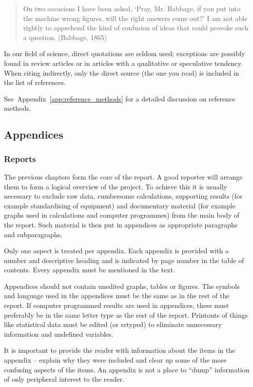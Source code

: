 \documentclass[a5paper, 10pt]{article}
\begin{document}
\begin{quote}
  On two occasions I have been asked, `Pray, Mr. Babbage, if you put
  into the machine wrong figures, will the right answers come out?' I
  am not able rightly to apprehend the kind of confusion of ideas that
  could provoke such a question. (Babbage, 1865)
\end{quote}

In our field of science, direct quotations
are seldom used; exceptions are possibly found in review articles or
in articles with a qualitative or speculative tendency.  When citing
indirectly, only the direct source (the one you read) is included in
the list of references.

See~Appendix~\ref{app:reference_methods} for a detailed discussion on
reference methods.

\subsection{Appendices}
\label{sec:appendices}
\subsubsection{Reports}
The previous chapters form the core of the report.  A good reporter
will arrange them to form a logical overview of the project.  To
achieve this it is usually necessary to exclude raw data, cumbersome
calculations, supporting results (for example standardising of
equipment) and documentary material (for example graphs used in
calculations and computer programmes) from the main body of the
report.  Such material is then put in appendices as appropriate
paragraphs and subparagraphs.

Only one aspect is treated per appendix.  Each appendix is provided
with a number and descriptive heading and is indicated by page number
in the table of contents.  Every appendix must be mentioned in the
text.

Appendices should not contain unedited graphs, tables or figures.  The
symbols and language used in the appendices must be the same as in the
rest of the report.  If computer programmed results are used in
appendices, these must preferably be in the same letter type as the
rest of the report.  Printouts of things like statistical data must be
edited (or retyped) to eliminate unnecessary information and undefined
variables.

It is important to provide the reader with information about the items
in the appendix -- explain why they were included and clear up some of
the more confusing aspects of the items.  An appendix is not a place
to ``dump'' information of only peripheral interest to the reader.
\end{document}
